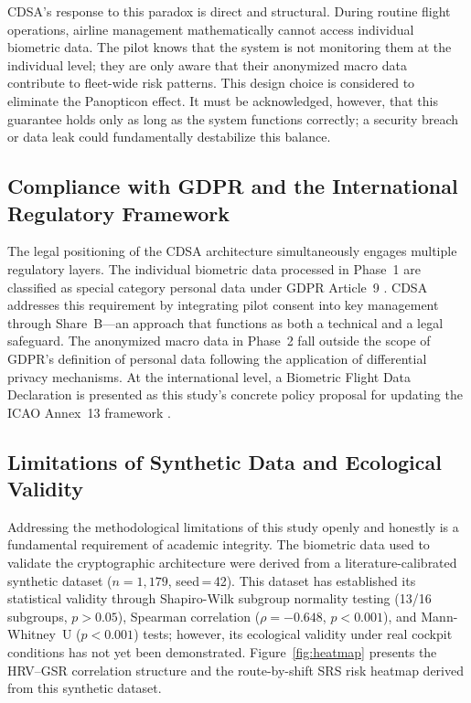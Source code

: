 \documentclass[12pt,a4paper]{article}
\begin{document}
CDSA's response to this paradox is direct and structural. During routine flight operations,
airline management mathematically cannot access individual biometric data. The pilot knows that
the system is not monitoring them at the individual level; they are only aware that their
anonymized macro data contribute to fleet-wide risk patterns. This design choice is considered
to eliminate the Panopticon effect. It must be acknowledged, however, that this guarantee holds
only as long as the system functions correctly; a security breach or data leak could
fundamentally destabilize this balance.

\subsection{Compliance with GDPR and the International Regulatory Framework}

The legal positioning of the CDSA architecture simultaneously engages multiple regulatory layers.
The individual biometric data processed in Phase~1 are classified as special category personal
data under GDPR Article~9 \citep{gdpr2016}. CDSA addresses this requirement by integrating
pilot consent into key management through Share~B---an approach that functions as both a technical
and a legal safeguard. The anonymized macro data in Phase~2 fall outside the scope of GDPR's
definition of personal data following the application of differential privacy mechanisms.
At the international level, a Biometric Flight Data Declaration is presented as this study's
concrete policy proposal for updating the ICAO Annex~13 framework \citep{icao2020}.

\subsection{Limitations of Synthetic Data and Ecological Validity}

Addressing the methodological limitations of this study openly and honestly is a fundamental
requirement of academic integrity. The biometric data used to validate the cryptographic
architecture were derived from a literature-calibrated synthetic dataset ($n=1{,}179$,
seed\,=\,42). This dataset has established its statistical validity through Shapiro-Wilk
subgroup normality testing (13/16 subgroups, $p>0.05$), Spearman correlation ($\rho=-0.648$,
$p<0.001$), and Mann-Whitney~U ($p<0.001$) tests; however, its ecological validity under real
cockpit conditions has not yet been demonstrated. Figure~\ref{fig:heatmap} presents the
HRV--GSR correlation structure and the route-by-shift SRS risk heatmap derived from this
synthetic dataset.
\end{document}
